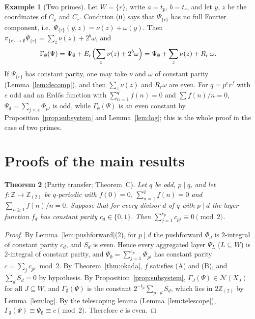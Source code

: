 \documentclass[11pt]{amsart}
\newtheorem{theorem}{Theorem}[section]
\theoremstyle{definition}
\newtheorem{example}[theorem]{Example}
\theoremstyle{remark}
\providecommand{\Z}{\mathbb Z}
\newcommand{\Zt}{\mathbb Z_{(2)}}
\newcommand{\Nn}{\mathcal N}
\numberwithin{equation}{section}
\begin{document}
\begin{example}[Two primes]\label{ex:two}
Let $W=\{r\}$, write $a=t_p$, $b=t_r$, and let $y$, $z$ be the coordinates of $C_p$ and $C_r$.
Condition (ii) says that $\Psi_{\{r\}}$ has no full Fourier component, i.e.\ $\Psi_{\{r\}}(y,z)=\nu(z)+\omega(y)$.
Then $\pi_{\{r\}\to\emptyset}\Psi_{\{r\}}=\sum_z\nu(z)+2^b\omega$, and
\[
\Gamma_\emptyset(\Psi)=\Psi_\emptyset+E_r\Bigl(\sum_z\nu(z)+2^b\omega\Bigr)=\Psi_\emptyset+\sum_z\nu(z)+R_r\,\omega .
\]
If $\Psi_{\{r\}}$ has constant parity, one may take $\nu$ and $\omega$ of constant parity (Lemma~\ref{lem:decomp}), and then $\sum_z\nu(z)$ and $R_r\omega$ are even.
For $q=p^{e}r^{f}$ with $e$ odd and an Erd\H{o}s function with $\sum_{n=1}^qf(n)=0$ and $\sum f(n)/n=0$, $\Psi_\emptyset=\sum_{j\le e}\Phi_{p^j}$ is odd, while $\Gamma_\emptyset(\Psi)$ is an even constant by Proposition~\ref{prop:subsystem} and Lemma~\ref{lem:log}; this is the whole proof in the case of two primes.
\end{example}
\section{Proofs of the main results}\label{sec:proofs}

\begin{theorem}[Parity transfer; Theorem~C]\label{thm:transfer}
Let $q$ be odd, $p\mid q$, and let $f\colon\Z\to\Zt$ be $q$-periodic with $f(0)=0$, $\sum_{n=1}^{q}f(n)=0$ and $\sum_{n\ge1}f(n)/n=0$.
Suppose that for every divisor $d$ of $q$ with $p\mid d$ the layer function $f_d$ has constant parity $c_d\in\{0,1\}$.
Then $\sum_{j=1}^{e_p}c_{p^j}\equiv0\pmod2$.
\end{theorem}

\begin{proof}
By Lemma~\ref{lem:pushforward}(2), for $p\mid d$ the pushforward $\Phi_d$ is $2$-integral of constant parity $c_d$, and $S_d$ is even.
Hence every aggregated layer $\Psi_L$ ($L\subseteq W$) is $2$-integral of constant parity, and $\Psi_\emptyset=\sum_{j=1}^{e_p}\Phi_{p^j}$ has constant parity $c=\sum_jc_{p^j}\bmod 2$.
By Theorem~\ref{thm:okada}, $f$ satisfies (A) and (B), and $\sum_dS_d=0$ by hypothesis.
By Proposition~\ref{prop:subsystem}, $\Gamma_J(\Psi)\in\Nn(X_J)$ for all $J\subseteq W$, and $\Gamma_\emptyset(\Psi)$ is the constant $2^{-t_p}\sum_{p\mid d}S_d$, which lies in $2\Zt$ by Lemma~\ref{lem:log}.
By the telescoping lemma (Lemma~\ref{lem:telescope}), $\Gamma_\emptyset(\Psi)\equiv\Psi_\emptyset\equiv c\pmod 2$.
Therefore $c$ is even.
\end{proof}
\end{document}
